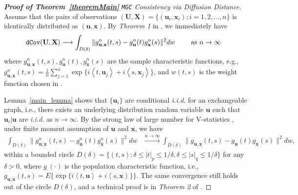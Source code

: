 \documentclass[11pt]{article}
\theoremstyle{definition}
\begin{document}
\begin{proof}[\textbf{Proof of Theorem~\ref{theoremMain}} \texttt{MGC} Consistency via Diffusion Distance]

Assume that the pairs of observations $(\mathbf{U}, \mathbf{X}) = \{ (\mathbf{u}_{i}, \mathbf{x}_{i}) ; i = 1,2, \ldots, n \}$ is identically distributed as $(\mathbf{u}, \mathbf{x})$. By \textit{Theorem 1} in \cite{szekely2007measuring}, we immediately have
\begin{eqnarray}
\mbox{\texttt{dCov}}(\mathbf{U},\mathbf{X}) &\longrightarrow \int_{D(\delta)}{\|g_{\mathbf{u},\mathbf{x}}^{n}(t,s)-g_{\mathbf{u}}^{n}(t)g_{\mathbf{x}}^{n}(s)\|^{2}}dw \quad \quad \mbox{ as } n \rightarrow \infty
\label{eq:conv1}
\end{eqnarray}
where $g_{\mathbf{u},\mathbf{x}}^{n}(t,s), g_{\mathbf{u}}^{n}(t), g_{\mathbf{x}}^{n}(s)$ are the sample characteristic functions, e.g., $g_{\mathbf{u},\mathbf{x}}^{n}(t,s)=\frac{1}{n}\sum_{j=1}^{n}\exp\{i \left\langle t,\mathbf{u}_{j} \right\rangle  +i \left\langle  s,\mathbf{x}_{j}\right\rangle \}$, and $w(t,s)$ is the weight function chosen in \cite{szekely2007measuring}. %

Lemma~\ref{main_lemma} shows that $\{ \mathbf{u}_{i} \}$ are conditional \textit{i.i.d.} for an exchangeable graph, i.e., there exists an underlying distribution random variable $\mathbf{u}$ such that $\mathbf{u}_{i}|\mathbf{u}$ are \textit{i.i.d.} as $n \rightarrow \infty$. By the strong law of large number for V-statistics \cite{KoroljukBook}, under finite moment assumption of $\mathbf{u}$ and $\mathbf{x}$, we have 
\begin{eqnarray}
\displaystyle\int_{D(\delta)}{\|g_{\mathbf{u},\mathbf{x}}^{n}(t,s)-g_{\mathbf{u}}^{n}(t)g_{\mathbf{x}}^{n}(s)\|^{2}}dw &\stackrel{n \rightarrow \infty}{\longrightarrow} 
\displaystyle\int_{D(\delta)}{\|g_{\mathbf{u},\mathbf{x}}(t,s)-g_{\mathbf{u}}(t)g_{\mathbf{x}}(s)\|^{2}}dw,
\label{eq:SLLN}
\end{eqnarray}
within a bounded circle $D(\delta)=\{(t,s):\delta \leq |t|_{p} \leq 1/\delta,\delta \leq |s|_{q} \leq 1/\delta\}$ for any $\delta>0$, where $g_{\cdot}(\cdot)$ is the population characteristic function, i.e., $g_{\mathbf{u},\mathbf{x}}(t,s) = E\{\exp\{i \left\langle t,\mathbf{u} \right\rangle  +i \left\langle  s,\mathbf{x}\right\rangle \}\}$. The same convergence still holds out of the circle $D(\delta)$, and a technical proof is in \textit{Theorem 2} of \cite{szekely2007measuring}.


\end{proof}
\end{document}
